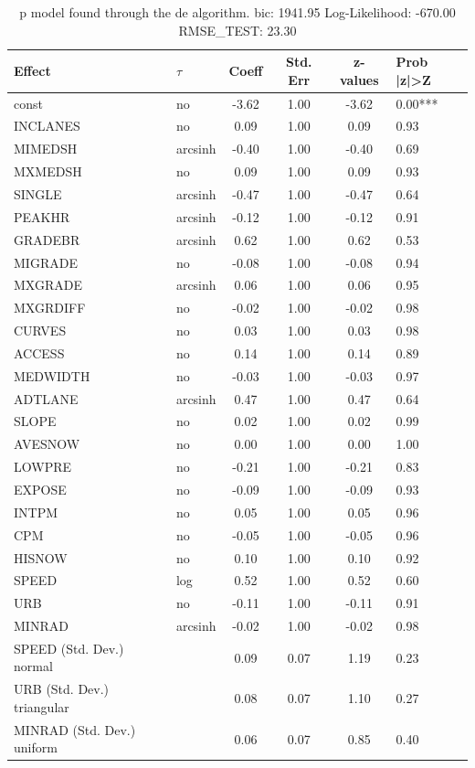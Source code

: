 \begin{table}
	\caption{p model found through the de algorithm. bic: 1941.95 Log-Likelihood: -670.00 RMSE_TEST: 23.30}
	\begin{center}
		\begin{tabular}{|l|l|c|c|c|l|}
			\hline
			Effect & $\tau$ & Coeff & Std. Err & z-values & Prob |z|>Z \\
			\hline
			const & no & -3.62 & 1.00 & -3.62 & 0.00*** \\
			\hline
			INCLANES & no & 0.09 & 1.00 & 0.09 & 0.93 \\
			\hline
			MIMEDSH & arcsinh & -0.40 & 1.00 & -0.40 & 0.69 \\
			\hline
			MXMEDSH & no & 0.09 & 1.00 & 0.09 & 0.93 \\
			\hline
			SINGLE & arcsinh & -0.47 & 1.00 & -0.47 & 0.64 \\
			\hline
			PEAKHR & arcsinh & -0.12 & 1.00 & -0.12 & 0.91 \\
			\hline
			GRADEBR & arcsinh & 0.62 & 1.00 & 0.62 & 0.53 \\
			\hline
			MIGRADE & no & -0.08 & 1.00 & -0.08 & 0.94 \\
			\hline
			MXGRADE & arcsinh & 0.06 & 1.00 & 0.06 & 0.95 \\
			\hline
			MXGRDIFF & no & -0.02 & 1.00 & -0.02 & 0.98 \\
			\hline
			CURVES & no & 0.03 & 1.00 & 0.03 & 0.98 \\
			\hline
			ACCESS & no & 0.14 & 1.00 & 0.14 & 0.89 \\
			\hline
			MEDWIDTH & no & -0.03 & 1.00 & -0.03 & 0.97 \\
			\hline
			ADTLANE & arcsinh & 0.47 & 1.00 & 0.47 & 0.64 \\
			\hline
			SLOPE & no & 0.02 & 1.00 & 0.02 & 0.99 \\
			\hline
			AVESNOW & no & 0.00 & 1.00 & 0.00 & 1.00 \\
			\hline
			LOWPRE & no & -0.21 & 1.00 & -0.21 & 0.83 \\
			\hline
			EXPOSE & no & -0.09 & 1.00 & -0.09 & 0.93 \\
			\hline
			INTPM & no & 0.05 & 1.00 & 0.05 & 0.96 \\
			\hline
			CPM & no & -0.05 & 1.00 & -0.05 & 0.96 \\
			\hline
			HISNOW & no & 0.10 & 1.00 & 0.10 & 0.92 \\
			\hline
			SPEED & log & 0.52 & 1.00 & 0.52 & 0.60 \\
			\hline
			URB & no & -0.11 & 1.00 & -0.11 & 0.91 \\
			\hline
			MINRAD & arcsinh & -0.02 & 1.00 & -0.02 & 0.98 \\
			\hline
			SPEED (Std. Dev.) normal &  & 0.09 & 0.07 & 1.19 & 0.23 \\
			\hline
			URB (Std. Dev.) triangular &  & 0.08 & 0.07 & 1.10 & 0.27 \\
			\hline
			MINRAD (Std. Dev.) uniform &  & 0.06 & 0.07 & 0.85 & 0.40 \\
			\hline
		\end{tabular}
	\end{center}
\end{table}